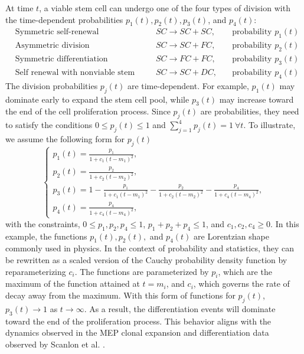 \documentclass[pdflatex,sn-mathphys-num]{sn-jnl}
\theoremstyle{thmstyleone}%
\theoremstyle{thmstyletwo}%
\theoremstyle{thmstylethree}%
\begin{document}
At time $t$, a viable stem cell can undergo one of the four types of division with the time-dependent probabilities $p_1(t), p_2(t), p_3(t)$, and $p_4(t)$:
\begin{align*}
    &\text{Symmetric self-renewal} &  SC \rightarrow SC + SC,  &  \quad \text{probability }p_1(t)  \\
    &\text{Asymmetric division} & SC \rightarrow SC + FC, & \quad \text{probability }p_2(t) \\
    &\text{Symmetric differentiation} &  SC \rightarrow FC + FC, & \quad \text{probability }p_3(t)\\
    &\text{Self renewal with nonviable stem cell} & SC \rightarrow SC + DC,& \quad \text{probability }p_4(t)
\end{align*}
The division probabilities $p_j(t)$ are time-dependent. For example, $p_1(t)$ may dominate early to expand the stem cell pool, while $p_3(t)$ may increase toward the end of the cell proliferation process. Since $p_j(t)$ are probabilities, they need to satisfy the conditions $0 \leq p_j(t) \leq 1$ and $\sum_{j=1}^4 p_j(t) = 1 \ \forall t$. To illustrate, we assume the following form for $p_j(t)$
\begin{equation} \label{lorentzian}
    \begin{cases}
        p_1(t) = \frac{p_1}{1+c_1(t-m_1)^2},\\
        p_2(t) = \frac{p_2}{1+c_2(t-m_2)^2},\\
        p_3(t) = 1- \frac{p_1}{1+c_1(t-m_1)^2} - \frac{p_2}{1+c_2(t-m_2)^2}- \frac{p_4}{1+c_4(t-m_4)^2}, \\
        p_4(t) = \frac{p_4}{1+c_4(t-m_4)^2},
    \end{cases}
\end{equation}
with the constraints, $0 \leq p_1, p_2, p_4 \leq 1$, $p_1 + p_2+p_4 \leq 1$, and $c_1, c_2, c_4 \geq 0$. In this example, the functions $p_1(t), p_2(t),$ and $p_4(t)$ are Lorentzian shape commonly used in physics. In the context of probability and statistics, they can be rewritten as a scaled version of the Cauchy probability density function by reparameterizing $c_i$. The functions are parameterized by $p_i$, which are the maximum of the function attained at $t = m_i$, and $c_i$, which governs the rate of decay away from the maximum. With this form of functions for $p_j(t)$, $p_3(t) \rightarrow 1$ as $t\rightarrow \infty$. As a result, the differentiation events will dominate toward the end of the proliferation process. This behavior aligns with the dynamics observed in the MEP clonal expansion and differentiation data observed by Scanlon et al. \cite{Sc2022}.
\end{document}
